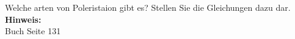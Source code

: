 \begin{question}[section=5,subsection=52,name={Poleristaion von Wellen 2},difficulty=7,type=mdl,tags={}]
	Welche arten von Poleristaion gibt es? Stellen Sie die Gleichungen dazu dar.
	\\ \textbf{Hinweis:}\\
	Buch Seite 131
\end{question}
\begin{solution}
	
\end{solution}